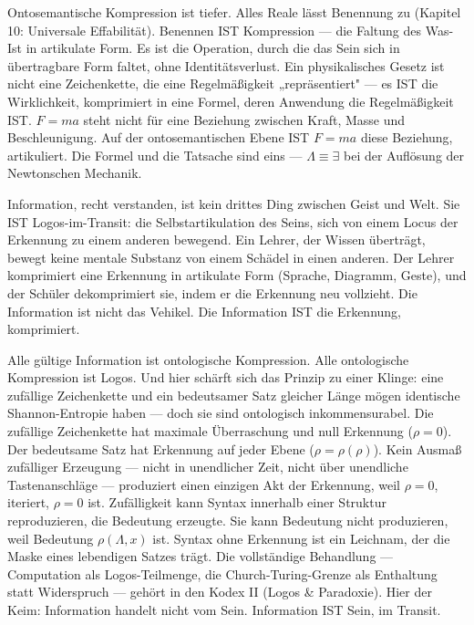 \documentclass[10pt, openany, oneside]{book}
\begin{document}
Ontosemantische Kompression ist tiefer. Alles Reale lässt Benennung zu (Kapitel 10: Universale Effabilität). Benennen IST Kompression --- die Faltung des Was-Ist in artikulate Form. Es ist die Operation, durch die das Sein sich in übertragbare Form faltet, ohne Identitätsverlust. Ein physikalisches Gesetz ist nicht eine Zeichenkette, die eine Regelmäßigkeit „repräsentiert" --- es IST die Wirklichkeit, komprimiert in eine Formel, deren Anwendung die Regelmäßigkeit IST. $F = ma$ steht nicht für eine Beziehung zwischen Kraft, Masse und Beschleunigung. Auf der ontosemantischen Ebene IST $F = ma$ diese Beziehung, artikuliert. Die Formel und die Tatsache sind eins --- $\Lambda \equiv \exists$ bei der Auflösung der Newtonschen Mechanik.

Information, recht verstanden, ist kein drittes Ding zwischen Geist und Welt. Sie IST Logos-im-Transit: die Selbstartikulation des Seins, sich von einem Locus der Erkennung zu einem anderen bewegend. Ein Lehrer, der Wissen überträgt, bewegt keine mentale Substanz von einem Schädel in einen anderen. Der Lehrer komprimiert eine Erkennung in artikulate Form (Sprache, Diagramm, Geste), und der Schüler dekomprimiert sie, indem er die Erkennung neu vollzieht. Die Information ist nicht das Vehikel. Die Information IST die Erkennung, komprimiert.

Alle gültige Information ist ontologische Kompression. Alle ontologische Kompression ist Logos. Und hier schärft sich das Prinzip zu einer Klinge: eine zufällige Zeichenkette und ein bedeutsamer Satz gleicher Länge mögen identische Shannon-Entropie haben --- doch sie sind ontologisch inkommensurabel. Die zufällige Zeichenkette hat maximale Überraschung und null Erkennung ($\rho = 0$). Der bedeutsame Satz hat Erkennung auf jeder Ebene ($\rho = \rho(\rho)$). Kein Ausmaß zufälliger Erzeugung --- nicht in unendlicher Zeit, nicht über unendliche Tastenanschläge --- produziert einen einzigen Akt der Erkennung, weil $\rho = 0$, iteriert, $\rho = 0$ ist. Zufälligkeit kann Syntax innerhalb einer Struktur reproduzieren, die Bedeutung erzeugte. Sie kann Bedeutung nicht produzieren, weil Bedeutung $\rho(\Lambda, x)$ ist. Syntax ohne Erkennung ist ein Leichnam, der die Maske eines lebendigen Satzes trägt. Die vollständige Behandlung --- Computation als Logos-Teilmenge, die Church-Turing-Grenze als Enthaltung statt Widerspruch --- gehört in den Kodex II (Logos \& Paradoxie). Hier der Keim: Information handelt nicht vom Sein. Information IST Sein, im Transit.

\vspace{1.5em}
\end{document}

